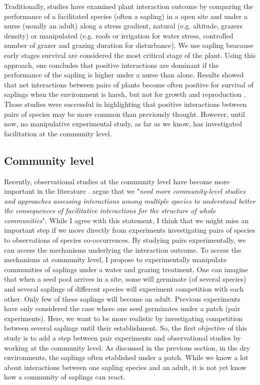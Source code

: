 \documentclass[12pt, a4paper]{article} %
\begin{document}
Traditionally, studies have examined plant interaction outcome by comparing the performance of a facilitated species (often a sapling) in a open site and under a nurse (usually an adult) along a stress gradient, natural (e.g. altitude, grazers density) or manipulated (e.g. roofs or irrigation for water stress, controlled number of grazer and grazing duration for disturbance). We use sapling beacause early stages survival are considered the most critical stage of the plant.
Using this approach, one concludes that positive interactions are dominant if the performance of the sapling is higher under a nurse than alone. Results showed that net interactions between pairs of plants become often positive for survival of saplings when the environment is harsh, but not for growth and reproduction \citep{He2013}.
Those studies were successful in highlighting that positive interactions between pairs of species may be more common than previously thought. However, until now, no manipulative experimental study, as far as we know, has investigated facilitation at the community level. 

\subsection{Community level}
Recently, observational studies at the community level have become more important in the literature \citep{Soliveres2012, Gross2013, Soliveres2014b,cavieres_facilitative_2014}. %
\citet{Soliveres2014} argue that we "\textit{need more community-level studies and approaches assessing interactions among multiple species to understand better the consequences of facilitative interactions for the structure of whole communities}". 
While I agree with this statement, I think that we might miss an important step if we move directly from experiments investigating pairs of species to observations of species co-occurrences. By studying pairs experimentally, we can access the mechanisms underlying the interaction outcome. 
To access the mechanisms at community level, I propose to experimentally manipulate communities of saplings under a water and grazing treatment.
One can imagine that when a seed pool arrives in a site, some will germinate (of several species) and several saplings of different species will experiment competition with each other. Only few of these saplings will become an adult. Previous experiments have only considered the case where one seed germinates under a patch (pair experiments). Here, we want to be more realistic by investigating competition between several saplings until their establishment. So, the first objective of this study is to add a step between pair experiments and observational studies by working at the community level. As discussed in the previous section, in the dry environments, the saplings often etablished under a patch. While we know a lot about interactions between one sapling species and an adult, it is not yet know how a community of saplings can react. 
\end{document}
